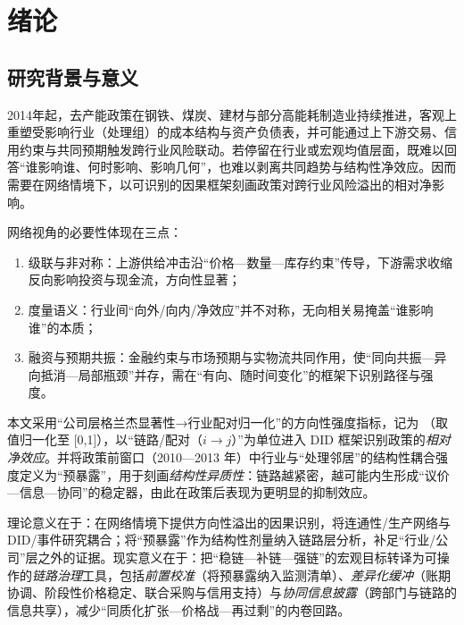 \chapter{绪论}
\label{chap:intro}

\section{研究背景与意义}
2014年起，去产能政策在钢铁、煤炭、建材与部分高能耗制造业持续推进，客观上重塑受影响行业（处理组）的成本结构与资产负债表，并可能通过上下游交易、信用约束与共同预期触发跨行业风险联动。若停留在行业或宏观均值层面，既难以回答“谁影响谁、何时影响、影响几何”，也难以剥离共同趋势与结构性净效应。因而需要在网络情境下，以可识别的因果框架刻画政策对跨行业风险溢出的相对净影响。

网络视角的必要性体现在三点：
\begin{enumerate}
  \item 级联与非对称：上游供给冲击沿“价格—数量—库存约束”传导，下游需求收缩反向影响投资与现金流，方向性显著；
  \item 度量语义：行业间“向外/向内/净效应”并不对称，无向相关易掩盖“谁影响谁”的本质；
  \item 融资与预期共振：金融约束与市场预期与实物流共同作用，使“同向共振—异向抵消—局部瓶颈”并存，需在“有向、随时间变化”的框架下识别路径与强度。
\end{enumerate}

本文采用“公司层格兰杰显著性→行业配对归一化”的方向性强度指标，记为 \II（取值归一化至 [0,1]），以“链路/配对（$i\to j$）”为单位进入 DID 框架识别政策的\emph{相对净效应}。并将政策前窗口（2010—2013 年）中行业与“处理邻居”的结构性耦合强度定义为“预暴露”，用于刻画\emph{结构性异质性}：链路越紧密，越可能内生形成“议价—信息—协同”的稳定器，由此在政策后表现为更明显的抑制效应。

理论意义在于：在网络情境下提供方向性溢出的因果识别，将连通性/生产网络与 DID/事件研究耦合；将“预暴露”作为结构性剂量纳入链路层分析，补足“行业/公司”层之外的证据。现实意义在于：把“稳链—补链—强链”的宏观目标转译为可操作的\emph{链路治理}工具，包括\emph{前置校准}（将预暴露纳入监测清单）、\emph{差异化缓冲}（账期协调、阶段性价格稳定、联合采购与信用支持）与\emph{协同信息披露}（跨部门与链路的信息共享），减少“同质化扩张—价格战—再过剩”的内卷回路。



